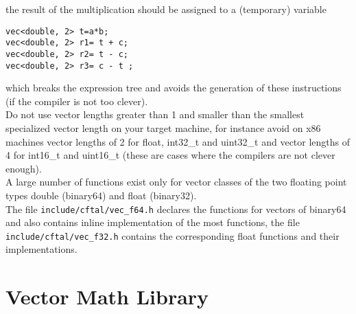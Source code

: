 \documentclass[10pt,a4paper,final,oneside]{article}
\numberwithin{equation}{subsection}
\begin{document}
the result of the multiplication should be assigned to a (temporary)
variable
\begin{lstlisting}
vec<double, 2> t=a*b;
vec<double, 2> r1= t + c;
vec<double, 2> r2= t - c;
vec<double, 2> r3= c - t ;
\end{lstlisting}
which breaks the expression tree and avoids the generation of these
instructions (if the compiler is not too clever).\\[10pt]
%
Do not use vector lengths greater than 1 and smaller than the smallest
specialized vector length on your target machine, for instance avoid on
x86 machines vector lengths of 2 for float, int32\_t and uint32\_t and
vector lengths of 4 for int16\_t and uint16\_t
(these are cases where the compilers are not clever enough).\\[10pt]
%
A large number of functions exist only for vector classes of the
two floating point types double (binary64) and float (binary32).\\
The file \texttt{include/cftal/vec\_f64.h} declares the functions
for vectors of binary64 and also contains inline implementation of
the most functions, the file \texttt{include/cftal/vec\_f32.h} contains
the corresponding float functions and their implementations.

\section{Vector Math Library}
\label{sec:vec_math_lib}
\end{document}

